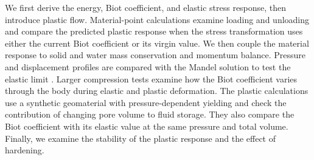 We first derive the energy, Biot coefficient, and elastic stress response,
then introduce plastic flow.  Material-point calculations examine loading
and unloading and compare the predicted plastic response when the stress
transformation uses either the current Biot coefficient or its virgin
value.  We then couple the material response to solid and water mass
conservation and momentum balance.  Pressure and displacement profiles are
compared with the Mandel solution to test the elastic limit
\citep{chengdetournay1988}.  Larger compression tests examine how the Biot
coefficient varies through the body during elastic and plastic deformation.
The plastic calculations use a synthetic geomaterial with
pressure-dependent yielding and check the contribution of changing pore
volume to fluid storage.  They also compare the Biot coefficient with its
elastic value at the same pressure and total volume.  Finally, we examine
the stability of the plastic response and the effect of hardening.
